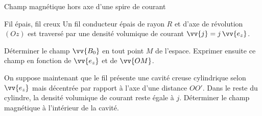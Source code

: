 \begin{exo}[PC][3][TD]{Champ magnétique hors axe d'une spire de courant}
\begin{quest}

\end{quest}
\end{exo}





\begin{exo}[PC][1][TD]{Fil épais, fil creux}
Un fil conducteur épais de rayon $R$ et d'axe de révolution $(Oz)$ est traversé par une densité volumique de courant $\vv{j}=j\,\vv{e_z}$.
\begin{quest}
\item Déterminer le champ $\vv{B_0}$ en tout point $M$ de l'espace. Exprimer ensuite ce champ en fonction de $\vv{e_z}$ et de $\vv{OM}$.
\item On suppose maintenant que le fil présente une cavité creuse cylindrique selon $\vv{e_z}$ mais décentrée par rapport à l'axe d'une distance $OO'$. Dans le reste du cylindre, la densité volumique de courant reste égale à $j$. Déterminer le champ magnétique à l'intérieur de la cavité.
\end{quest}
\end{exo}

